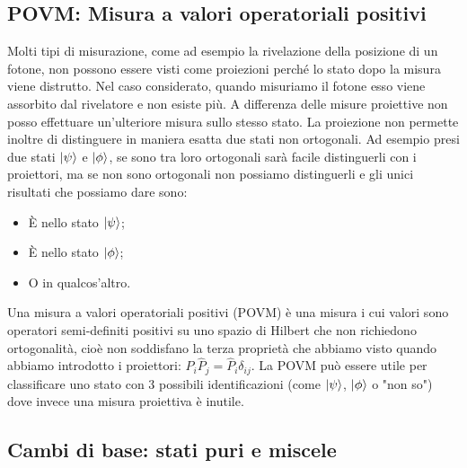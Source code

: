 \subsection{POVM: Misura a valori operatoriali positivi}
Molti tipi di misurazione, come ad esempio la rivelazione della posizione di un fotone, non possono essere visti come proiezioni perché lo stato dopo la misura viene distrutto. Nel caso considerato, quando misuriamo il fotone esso viene assorbito dal rivelatore e non esiste più. A differenza delle misure proiettive non posso effettuare un'ulteriore misura sullo stesso stato. La proiezione non permette inoltre di distinguere in maniera esatta due stati non ortogonali. Ad esempio presi due stati $\ket \psi$ e $\ket \phi$, se sono tra loro ortogonali sarà facile distinguerli con i proiettori, ma se non sono ortogonali non possiamo distinguerli e gli unici risultati che possiamo dare sono:
\begin{itemize}
    \item È nello stato $\ket \psi$;
    \item È nello stato $\ket \phi$;
    \item O in qualcos'altro.
\end{itemize}
Una misura a valori operatoriali positivi (POVM) è una misura i cui valori sono operatori semi-definiti positivi su uno spazio di Hilbert che non richiedono ortogonalità, cioè non soddisfano la terza proprietà che abbiamo visto quando abbiamo introdotto i proiettori: $\hat P_i \hat P_j = \hat P_i\delta_{ij}$. La POVM può essere utile per classificare uno stato con 3 possibili identificazioni (come $\ket \psi$, $\ket \phi$ o "non so") dove invece una misura proiettiva è inutile.

\subsection{Cambi di base: stati puri e miscele}

